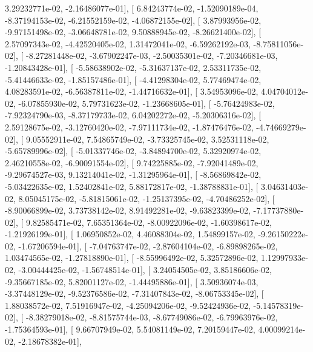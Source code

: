 \documentclass{article}
\begin{document}
          3.29232771e-02,  -2.16486077e-01],
       [  6.84243774e-02,  -1.52090189e-04,  -8.37194153e-02,
         -6.21552159e-02,  -4.06872155e-02],
       [  3.87993956e-02,  -9.97151498e-02,  -3.06648781e-02,
          9.50888945e-02,  -8.26621400e-02],
       [  2.57097343e-02,  -4.42520405e-02,   1.31472041e-02,
         -6.59262192e-03,  -8.75811056e-02],
       [ -8.27281448e-02,  -3.67902247e-03,  -2.50035301e-02,
         -7.20346681e-03,  -1.20843428e-01],
       [ -5.58638902e-02,  -5.31637137e-02,   2.53311735e-02,
         -5.41446633e-02,  -1.85157486e-01],
       [ -4.41298304e-02,   5.77469474e-02,   4.08283591e-02,
         -6.56387811e-02,  -1.44716632e-01],
       [  3.54953096e-02,   4.04704012e-02,  -6.07855930e-02,
          5.79731623e-02,  -1.23668605e-01],
       [ -5.76424983e-02,  -7.92324790e-03,  -8.37179733e-02,
          6.04202272e-02,  -5.20306316e-02],
       [  2.59128675e-02,  -3.12760420e-02,  -7.97111734e-02,
         -1.87476476e-02,  -4.74669279e-02],
       [  9.05552911e-02,   7.54865749e-02,  -3.73325745e-02,
          3.52531118e-02,  -5.65789996e-02],
       [ -5.01337746e-02,  -3.84894700e-02,   5.32920974e-02,
          2.46210558e-02,  -6.90091554e-02],
       [  9.74225885e-02,  -7.92041489e-02,  -9.29674527e-03,
          9.13214041e-02,  -1.31295964e-01],
       [ -8.56869842e-02,  -5.03422635e-02,   1.52402841e-02,
          5.88172817e-02,  -1.38788831e-01],
       [  3.04631403e-02,   8.05045175e-02,  -5.81815061e-02,
         -1.25137395e-02,  -4.70486252e-02],
       [ -8.90066899e-02,   3.73738142e-02,   8.91492281e-02,
         -9.63823399e-02,  -7.17737880e-02],
       [  9.82585471e-02,   7.65351364e-02,  -8.00922096e-02,
         -1.60398617e-02,  -1.21926199e-01],
       [  1.06950852e-02,   4.46088304e-02,   1.54899157e-02,
         -9.26150222e-02,  -1.67206594e-01],
       [ -7.04763747e-02,  -2.87604104e-02,  -6.89898265e-02,
          1.03474565e-02,  -1.27818890e-01],
       [ -8.55996492e-02,   5.32572896e-02,   1.12997933e-02,
         -3.00444425e-02,  -1.56748514e-01],
       [  3.24054505e-02,   3.85186606e-02,  -9.35667185e-02,
          5.82001127e-02,  -1.44495886e-01],
       [  3.50936074e-03,  -3.37448129e-02,  -9.52376586e-02,
         -7.31407843e-02,  -8.06753345e-02],
       [  1.88038572e-02,   7.51916947e-02,  -4.25094206e-02,
         -9.52424936e-02,  -5.14578319e-02],
       [ -8.38279018e-02,  -8.81575744e-03,  -8.67749086e-02,
         -6.79963976e-02,  -1.75364593e-01],
       [  9.66707949e-02,   5.54081149e-02,   7.20159447e-02,
          4.00099214e-02,  -2.18678382e-01],
\end{document}
